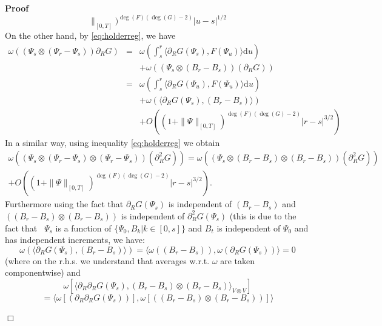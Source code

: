 \documentclass{article}
\newcommand{\mathd}{\mathrm{d}}
\newcommand{\nobracket}{}
\newenvironment{proof}{\noindent\textbf{Proof\ }}{\hspace*{\fill}$\Box$\medskip}
\begin{document}
\begin{proof}
\begin{equation}
    \|_{[0, T]})^{\deg (F) (\deg (G) - 2)} | u - s |^{1 / 2}
    \label{eq:holderreg3}
  \end{equation}
  On the other hand, by {\eqref{eq:holderreg}}, we have
  \begin{equation}
    \begin{array}{lll}
      \omega ((\Psi_s \otimes (\Psi_r - \Psi_s)) \partial_R G) & = & \omega
      \left( \int_s^r \langle \partial_R G (\Psi_s), F (\Psi_u) \rangle \mathd
      u \right)\\
      &  & + \omega ((\Psi_s \otimes (B_r - B_s)) (\partial_R G))\\
      & = & \omega \left( \int_s^r \langle \partial_R G (\Psi_u), F (\Psi_u)
      \rangle \mathd u \right)\\
      &  & + \omega (\langle \partial_R G (\Psi_s), (B_r - B_s) \rangle)\\
      &  & + O ((1 + \| \Psi \|_{[0, T]})^{\deg (F) (\deg (G) - 2)} | r - s
      |^{3 / 2})
    \end{array} \label{eq:holderreg4}
  \end{equation}
  In a similar way, using inequality {\eqref{eq:holderreg}} we obtain
  \begin{equation}
    \begin{array}{c}
      \omega ((\Psi_s \otimes (\Psi_r - \Psi_s) \otimes (\Psi_r - \Psi_s))
      (\partial_R^2 G)) = \omega ((\Psi_s \otimes (B_r - B_s) \otimes (B_r -
      B_s)) (\partial_R^2 G))\\
      + O ((1 + \| \Psi \|_{[0, T]})^{\deg (F) (\deg (G) - 2)} | r - s |^{3 /
      2}) .
    \end{array}
  \end{equation}
  Furthermore using the fact that $\partial_R G (\Psi_s)$ is independent of
  $(B_r - B_s)$ and $((B_r - B_s) \otimes (B_r - B_s))$ is independent of
  $\partial_R^2 G (\Psi_s)$ (this is due to the fact that \ $\Psi_s$ is a
  function of $\nobracket \{ \Psi_0, B_k | \nobracket \nobracket k \in [0, s]
  \}$ and $B_t$ is independent of $\Psi_0$ and has independent increments, we
  have:
  \[ \omega (\langle \partial_R G (\Psi_s), (B_r - B_s) \rangle) = \langle
     \omega ((B_r - B_s)), \omega (\partial_R G (\Psi_s)) \rangle = 0 \]
  (where on the r.h.s. we understand that averages w.r.t. $\omega$ are taken
  componentwise) and
  \[ \omega [\langle \partial_R \partial_R G (\Psi_s), (B_r - B_s) \otimes
     (B_r - B_s) \rangle_{V \otimes V}] \]
  \[ = \langle \omega [(\partial_R \partial_R G (\Psi_s))], \omega [((B_r -
     B_s) \otimes (B_r - B_s))] \rangle \]

\end{proof}
\end{document}

